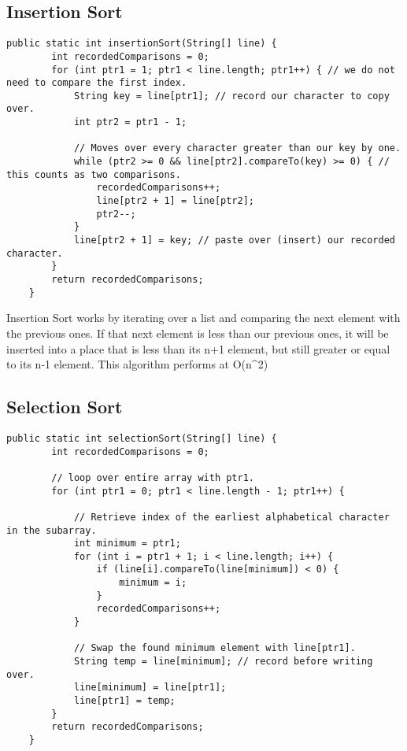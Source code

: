 \documentclass[letterpaper, 10pt,DIV=13]{scrartcl}
\numberwithin{equation}{section} %
\numberwithin{figure}{section} %
\numberwithin{table}{section} %
\begin{document}
\subsection{Insertion Sort}
\begin{lstlisting}[frame=single, ] 
    public static int insertionSort(String[] line) {
        int recordedComparisons = 0;
        for (int ptr1 = 1; ptr1 < line.length; ptr1++) { // we do not need to compare the first index.
            String key = line[ptr1]; // record our character to copy over.
            int ptr2 = ptr1 - 1;

            // Moves over every character greater than our key by one.
            while (ptr2 >= 0 && line[ptr2].compareTo(key) >= 0) { // this counts as two comparisons.
                recordedComparisons++;
                line[ptr2 + 1] = line[ptr2];
                ptr2--;
            }
            line[ptr2 + 1] = key; // paste over (insert) our recorded character.
        }
        return recordedComparisons;
    }
\end{lstlisting}
Insertion Sort works by iterating over a list and comparing the next element with the previous ones. If that next element is less than our previous ones, it will be inserted into a place that is less than its n+1 element, but still greater or equal to its n-1 element. This algorithm performs at O(n^{2})

\subsection{Selection Sort}
\begin{lstlisting}[frame=single, ]  
    public static int selectionSort(String[] line) {
        int recordedComparisons = 0;

        // loop over entire array with ptr1.
        for (int ptr1 = 0; ptr1 < line.length - 1; ptr1++) {

            // Retrieve index of the earliest alphabetical character in the subarray.
            int minimum = ptr1;
            for (int i = ptr1 + 1; i < line.length; i++) {
                if (line[i].compareTo(line[minimum]) < 0) {
                    minimum = i;
                }
                recordedComparisons++;
            }

            // Swap the found minimum element with line[ptr1].
            String temp = line[minimum]; // record before writing over.
            line[minimum] = line[ptr1];
            line[ptr1] = temp;
        }
        return recordedComparisons;
    }
\end{lstlisting}
    
\end{document}
